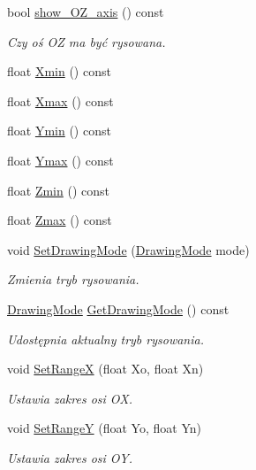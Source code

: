 \begin{DoxyCompactItemize}
bool \hyperlink{class_pz_g_1_1_gnuplot_link_ab64b940900a005045dce0f4a13f2ab54}{show\+\_\+\+O\+Z\+\_\+axis} () const 
\begin{DoxyCompactList}\small\item\em Czy oś OZ ma być rysowana. \end{DoxyCompactList}\item 
float \hyperlink{class_pz_g_1_1_gnuplot_link_afb8a3cb4ceb164a81bc49a5f15da712c}{Xmin} () const 
\item 
float \hyperlink{class_pz_g_1_1_gnuplot_link_a3a52abbe4b555f7e021f11d7af4950e8}{Xmax} () const 
\item 
float \hyperlink{class_pz_g_1_1_gnuplot_link_a88ccb047ebb0d79fa008e8347c57d742}{Ymin} () const 
\item 
float \hyperlink{class_pz_g_1_1_gnuplot_link_a438a7d313d30a209ef413aa1c339bb1e}{Ymax} () const 
\item 
float \hyperlink{class_pz_g_1_1_gnuplot_link_a5bc2e5f8c07dbe7d0f4e3f3ec3475769}{Zmin} () const 
\item 
float \hyperlink{class_pz_g_1_1_gnuplot_link_ad69c4841d707b9a19b003a46d6f80460}{Zmax} () const 
\item 
void \hyperlink{class_pz_g_1_1_gnuplot_link_a5b903bc69eb4c2884edbe25d53cea188}{Set\+Drawing\+Mode} (\hyperlink{namespace_pz_g_a4360c76a1dbf714a19a0d97fe56e0660}{Drawing\+Mode} mode)
\begin{DoxyCompactList}\small\item\em Zmienia tryb rysowania. \end{DoxyCompactList}\item 
\hyperlink{namespace_pz_g_a4360c76a1dbf714a19a0d97fe56e0660}{Drawing\+Mode} \hyperlink{class_pz_g_1_1_gnuplot_link_a04f53a5fa365789ea6a4fa2142b686dc}{Get\+Drawing\+Mode} () const 
\begin{DoxyCompactList}\small\item\em Udostępnia aktualny tryb rysowania. \end{DoxyCompactList}\item 
void \hyperlink{class_pz_g_1_1_gnuplot_link_a7db1d889cd30bfb23cb4af3ca4bb4ef0}{Set\+RangeX} (float Xo, float Xn)
\begin{DoxyCompactList}\small\item\em Ustawia zakres osi {\itshape OX}. \end{DoxyCompactList}\item 
void \hyperlink{class_pz_g_1_1_gnuplot_link_a269f721e7d49c37a842c1f65511a7d71}{Set\+RangeY} (float Yo, float Yn)
\begin{DoxyCompactList}\small\item\em Ustawia zakres osi {\itshape OY}. \end{DoxyCompactList}\item 

\end{DoxyCompactItemize}
